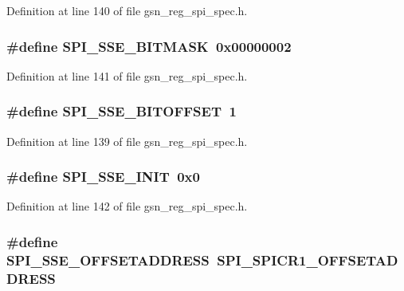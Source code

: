 Definition at line 140 of file gsn\_\-reg\_\-spi\_\-spec.h.

\hypertarget{a00573_acfaaa8c0edbc2da742d1e3bb4b31a3db}{
\subsubsection[{SPI\_\-SSE\_\-BITMASK}]{\setlength{\rightskip}{0pt plus 5cm}\#define SPI\_\-SSE\_\-BITMASK~0x00000002}}
\label{a00573_acfaaa8c0edbc2da742d1e3bb4b31a3db}


Definition at line 141 of file gsn\_\-reg\_\-spi\_\-spec.h.

\hypertarget{a00573_af6a30258987277a9ea19b5cb36c4d8b0}{
\subsubsection[{SPI\_\-SSE\_\-BITOFFSET}]{\setlength{\rightskip}{0pt plus 5cm}\#define SPI\_\-SSE\_\-BITOFFSET~1}}
\label{a00573_af6a30258987277a9ea19b5cb36c4d8b0}


Definition at line 139 of file gsn\_\-reg\_\-spi\_\-spec.h.

\hypertarget{a00573_a4cc4519c062525a4516ac7c0e3e473da}{
\subsubsection[{SPI\_\-SSE\_\-INIT}]{\setlength{\rightskip}{0pt plus 5cm}\#define SPI\_\-SSE\_\-INIT~0x0}}
\label{a00573_a4cc4519c062525a4516ac7c0e3e473da}


Definition at line 142 of file gsn\_\-reg\_\-spi\_\-spec.h.

\hypertarget{a00573_a172c46569e97fe65061e141abc4ab35b}{
\subsubsection[{SPI\_\-SSE\_\-OFFSETADDRESS}]{\setlength{\rightskip}{0pt plus 5cm}\#define SPI\_\-SSE\_\-OFFSETADDRESS~SPI\_\-SPICR1\_\-OFFSETADDRESS}}
\label{a00573_a172c46569e97fe65061e141abc4ab35b}


